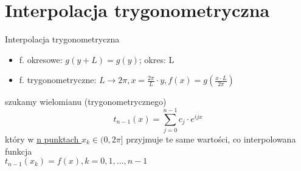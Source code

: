 \section{Interpolacja trygonometryczna}
\begin{frame}{Interpolacja trygonometryczna}
	\begin{itemize}
		\item f. okresowe: $g(y + L) = g(y)$; okres: L \\
		\item f. trygonometryczne: $L \to 2\pi, x = \frac{2\pi}{L} \cdot y, f(x) = g(\frac{x \cdot L}{2\pi})$	
	\end{itemize}
	szukamy wielomianu (trygonometrycznego)
	\[
		t_{n-1}(x) = \sum\limits_{j = 0}^{n-1} c_j \cdot e^{ijx}
		\tag{16.12}
	\]
	który w \underline{n punktach $x_k \in (0, 2\pi]$} przyjmuje te same wartości, co interpolowana funkcja
	\\ $t_{n - 1}(x_k) = f(x), k = 0, 1, \dots, n - 1$
\end{frame}
